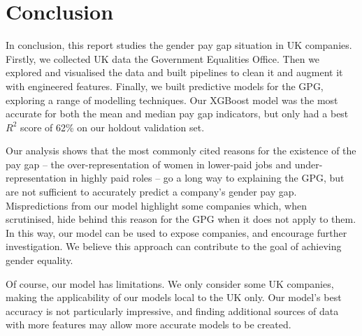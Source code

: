 
\section{Conclusion}
In conclusion, this report studies the gender pay gap situation in UK companies. Firstly, we collected UK data the Government Equalities Office. Then we explored and visualised the data and built pipelines to clean it and augment it with engineered features. Finally,  we built predictive models for the GPG, exploring a range of modelling techniques. Our XGBoost model was the most accurate for both the mean and median pay gap indicators, but only had a best $R^2$ score of 62\% on our holdout validation set.

Our analysis shows that the most commonly cited reasons for the existence of the pay gap -- the over-representation of women in lower-paid jobs and under-representation in highly paid roles -- go a long way to explaining the GPG, but are not sufficient to accurately predict a company's gender pay gap. Mispredictions from our model highlight some companies which, when scrutinised, hide behind this reason for the GPG when it does not apply to them. 
In this way, our model can be used to expose companies, and encourage further investigation. We believe this approach can contribute to the goal of achieving gender equality. 

Of course, our model has limitations. We only consider some UK companies, making the applicability of our models local to the UK only. Our model's best accuracy is not particularly impressive, and finding additional sources of data with more features may allow more accurate models to be created.

